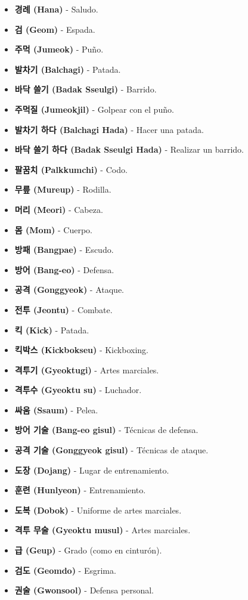 \begin{itemize}
	\item \textbf{경례 (Hana)} - Saludo.
	\item \textbf{검 (Geom)} - Espada.
	\item \textbf{주먹 (Jumeok)} - Puño.
	\item \textbf{발차기 (Balchagi)} - Patada.
	\item \textbf{바닥 쓸기 (Badak Sseulgi)} - Barrido.
	\item \textbf{주먹질 (Jumeokjil)} - Golpear con el puño.
	\item \textbf{발차기 하다 (Balchagi Hada)} - Hacer una patada.
	\item \textbf{바닥 쓸기 하다 (Badak Sseulgi Hada)} - Realizar un barrido.
	\item \textbf{팔꿈치 (Palkkumchi)} - Codo.
	\item \textbf{무릎 (Mureup)} - Rodilla.
	\item \textbf{머리 (Meori)} - Cabeza.
	\item \textbf{몸 (Mom)} - Cuerpo.
	\item \textbf{방패 (Bangpae)} - Escudo.
	\item \textbf{방어 (Bang-eo)} - Defensa.
	\item \textbf{공격 (Gonggyeok)} - Ataque.
	\item \textbf{전투 (Jeontu)} - Combate.
	\item \textbf{킥 (Kick)} - Patada.
	\item \textbf{킥박스 (Kickbokseu)} - Kickboxing.
	\item \textbf{격투기 (Gyeoktugi)} - Artes marciales.
	\item \textbf{격투수 (Gyeoktu su)} - Luchador.
	\item \textbf{싸움 (Ssaum)} - Pelea.
	\item \textbf{방어 기술 (Bang-eo gisul)} - Técnicas de defensa.
	\item \textbf{공격 기술 (Gonggyeok gisul)} - Técnicas de ataque.
	\item \textbf{도장 (Dojang)} - Lugar de entrenamiento.
	\item \textbf{훈련 (Hunlyeon)} - Entrenamiento.
	\item \textbf{도복 (Dobok)} - Uniforme de artes marciales.
	\item \textbf{격투 무술 (Gyeoktu musul)} - Artes marciales.
	\item \textbf{급 (Geup)} - Grado (como en cinturón).
	\item \textbf{검도 (Geomdo)} - Esgrima.
	\item \textbf{권술 (Gwonsool)} - Defensa personal.

\end{itemize}



